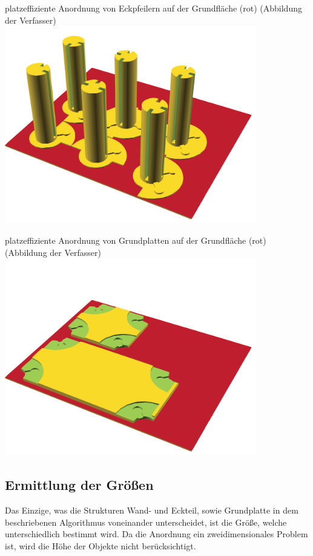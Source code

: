 \begin{Bild}{platzeffiziente Anordnung von Eckpfeilern auf der Grundfläche (rot) (Abbildung der Verfasser)}
	\includegraphics[width = 110mm]{Bilder/PlacementCorners-12}
	\label{corner}
\end{Bild}

\begin{Bild}{platzeffiziente Anordnung von Grundplatten auf der Grundfläche (rot) (Abbildung der Verfasser)}
	\includegraphics[width = 110mm]{Bilder/PlacementBasePlate-13}
\end{Bild}

\subsection{Ermittlung der Größen}
Das Einzige, was die Strukturen Wand- und Eckteil, sowie Grundplatte in dem beschriebenen Algorithmus voneinander unterscheidet, ist die Größe, welche unterschiedlich bestimmt wird.
Da die Anordnung ein zweidimensionales Problem ist, wird die Höhe der Objekte nicht berücksichtigt.


